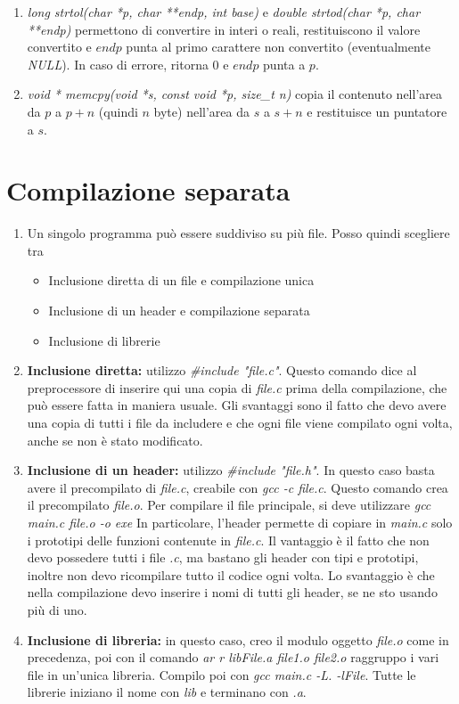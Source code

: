 \documentclass[a4paper,11pt]{article}
\begin{document}
\begin{enumerate}[resume]
	\item \textit{long strtol(char *p, char **endp, int base)} e \textit{double strtod(char *p, char **endp)} permettono di convertire in interi o reali, restituiscono il valore convertito e $endp$ punta al primo carattere non convertito (eventualmente \textit{NULL}). In caso di errore, ritorna 0 e $endp$ punta a $p$.
	\item \textit{void * memcpy(void *s, const void *p, size\_t n)} copia il contenuto nell'area da $p$ a $p+n$ (quindi $n$ byte) nell'area da $s$ a $s+n$ e restituisce un puntatore a $s$.
\end{enumerate}
\section{Compilazione separata}
\begin{enumerate}[resume]
	\item Un singolo programma può essere suddiviso su più file. Posso quindi scegliere tra
	\begin{itemize}
		\item Inclusione diretta di un file e compilazione unica
		\item Inclusione di un header e compilazione separata
		\item Inclusione di librerie
	\end{itemize}
	\item\textbf{Inclusione diretta:} utilizzo \textit{\#include "file.c"}. Questo comando dice al preprocessore di inserire qui una copia di \textit{file.c} prima della compilazione, che può essere fatta in maniera usuale. Gli svantaggi sono il fatto che devo avere una copia di tutti i file da includere e che ogni file viene compilato ogni volta, anche se non è stato modificato.
	\item\textbf{Inclusione di un header:} utilizzo \textit{\#include "file.h"}. In questo caso basta avere il precompilato di \textit{file.c}, creabile con \textit{gcc -c file.c}. Questo comando crea il precompilato \textit{file.o}. Per compilare il file principale, si deve utilizzare \textit{gcc main.c file.o -o exe} In particolare, l'header permette di copiare in \textit{main.c} solo i prototipi delle funzioni contenute in \textit{file.c}. Il vantaggio è il fatto che non devo possedere tutti i file \textit{.c}, ma bastano gli header con tipi e prototipi, inoltre non devo ricompilare tutto il codice ogni volta. Lo svantaggio è che nella compilazione devo inserire i nomi di tutti gli header, se ne sto usando più di uno.
	\item\textbf{Inclusione di libreria:} in questo caso, creo il modulo oggetto \textit{file.o} come in precedenza, poi con il comando \textit{ar r libFile.a file1.o file2.o} raggruppo i vari file in un'unica libreria. Compilo poi con \textit{gcc main.c  -L. -lFile}. Tutte le librerie iniziano il nome con \textit{lib} e terminano con \textit{.a}.
\end{enumerate}
\end{document}
